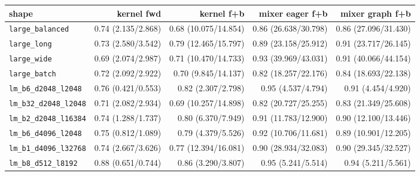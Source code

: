\begin{tabular}{l r r r r }
\toprule
shape & kernel fwd & kernel f+b & mixer eager f+b & mixer graph f+b \\
\midrule
\texttt{large\_balanced} & 0.74 (2.135/2.868) & 0.68 (10.075/14.854) & 0.86 (26.638/30.798) & 0.86 (27.096/31.430) \\
\texttt{large\_long} & 0.73 (2.580/3.542) & 0.79 (12.465/15.797) & 0.89 (23.158/25.912) & 0.91 (23.717/26.145) \\
\texttt{large\_wide} & 0.69 (2.074/2.987) & 0.71 (10.470/14.733) & 0.93 (39.969/43.031) & 0.91 (40.066/44.154) \\
\texttt{large\_batch} & 0.72 (2.092/2.922) & 0.70 (9.845/14.137) & 0.82 (18.257/22.176) & 0.84 (18.693/22.138) \\
\texttt{lm\_b6\_d2048\_l2048} & 0.76 (0.421/0.553) & 0.82 (2.307/2.798) & 0.95 (4.537/4.794) & 0.91 (4.454/4.920) \\
\texttt{lm\_b32\_d2048\_l2048} & 0.71 (2.082/2.934) & 0.69 (10.257/14.898) & 0.82 (20.727/25.255) & 0.83 (21.349/25.608) \\
\texttt{lm\_b2\_d2048\_l16384} & 0.74 (1.288/1.737) & 0.80 (6.370/7.949) & 0.91 (11.783/12.900) & 0.90 (12.100/13.446) \\
\texttt{lm\_b6\_d4096\_l2048} & 0.75 (0.812/1.089) & 0.79 (4.379/5.526) & 0.92 (10.706/11.681) & 0.89 (10.901/12.205) \\
\texttt{lm\_b1\_d4096\_l32768} & 0.74 (2.667/3.626) & 0.77 (12.394/16.081) & 0.90 (28.934/32.083) & 0.90 (29.345/32.527) \\
\texttt{lm\_b8\_d512\_l8192} & 0.88 (0.651/0.744) & 0.86 (3.290/3.807) & 0.95 (5.241/5.514) & 0.94 (5.211/5.561) \\
\bottomrule
\end{tabular}
